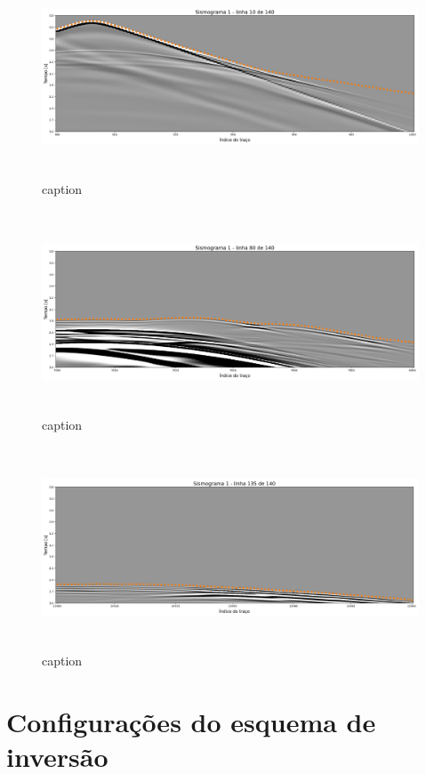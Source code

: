 \begin{figure}[H]
	\centering
	\includegraphics[width=16cm,height=6cm]{Imgs/Metodologia/linha10_sismo1.png}
	\caption{caption}
	\label{fig:}	
\end{figure}

\begin{figure}[H]
	\centering
	\includegraphics[width=16cm,height=6cm]{Imgs/Metodologia/linha80_sismo1.png}
	\caption{caption}
	\label{fig:}	
\end{figure}

\begin{figure}[H]
	\centering
	\includegraphics[width=16cm,height=6cm]{Imgs/Metodologia/linha135_sismo1.png}
	\caption{caption}
	\label{fig:}	
\end{figure}




\section{Configurações do esquema de inversão}



